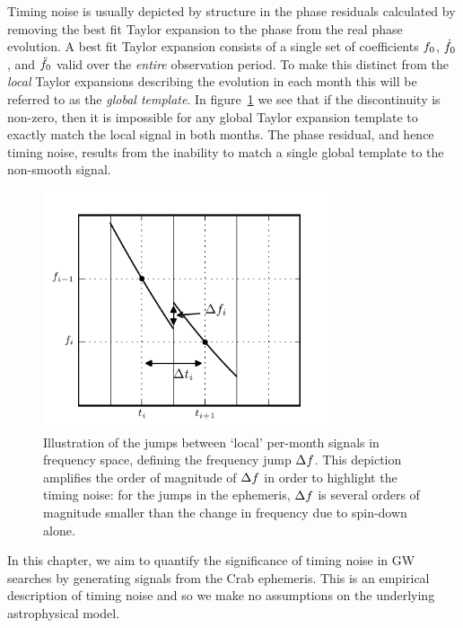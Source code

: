 \documentclass[../full_thesis/full_thesis.tex]{subfiles}
\begin{document}
Timing noise is usually depicted by structure in the phase residuals calculated
by removing the best fit Taylor expansion to the phase from the real phase
evolution. A best fit Taylor expansion consists of a single set of coefficients
$f_{0}$, $\dot{f}_{0}$, and $\ddot{f}_{0}$ valid over the \emph{entire}
observation period. To make this distinct from the \emph{local} Taylor
expansions describing the evolution in each month this will be referred to as
the \emph{global template}.  In figure~\ref{fig: template jumps} we see that if
the discontinuity is non-zero, then it is impossible for any global Taylor
expansion template to exactly match the local signal in both months. The
phase residual, and hence timing noise, results from the inability to match a
single global template to the non-smooth signal.

\begin{figure}[htb]
\centering
    \includegraphics[width=0.75\textwidth]{template_jumps}
\caption{Illustration of the jumps between `local' per-month signals in
    frequency space, defining the frequency jump $\Delta f$. This
        depiction amplifies the order of magnitude of $\Delta f$ in order to
        highlight the timing noise: for the jumps in the ephemeris, $\Delta f$
        is several orders of magnitude smaller than the change in frequency
        due to spin-down alone.}
\label{fig: template jumps}
\end{figure}

In this chapter, we aim to quantify the significance of timing
noise in GW searches by generating signals from the Crab ephemeris. This
is an empirical description of timing noise and so we
make no assumptions on the underlying astrophysical model.
\end{document}

